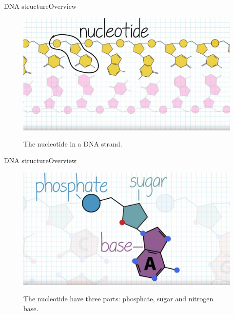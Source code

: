 \documentclass[10pt]{beamer}
\begin{document}
{%
\begin{frame}{DNA structure}{Overview}
	\begin{figure}[]
		\centering
		\includegraphics[width=\textwidth,height=0.7\textheight,keepaspectratio]{img/introduction/dna6.jpg}
		\label{img:mot2}
		\caption{The nucleotide in a DNA strand.}
	\end{figure}
\end{frame}

\begin{frame}{DNA structure}{Overview}
	\begin{figure}[]
		\centering
		\includegraphics[width=\textwidth,height=0.7\textheight,keepaspectratio]{img/introduction/dna7.jpg}
		\label{img:mot2}
		\caption{The nucleotide have three parts: phosphate, sugar and nitrogen base.}
	\end{figure}
\end{frame}

}
\end{document}
